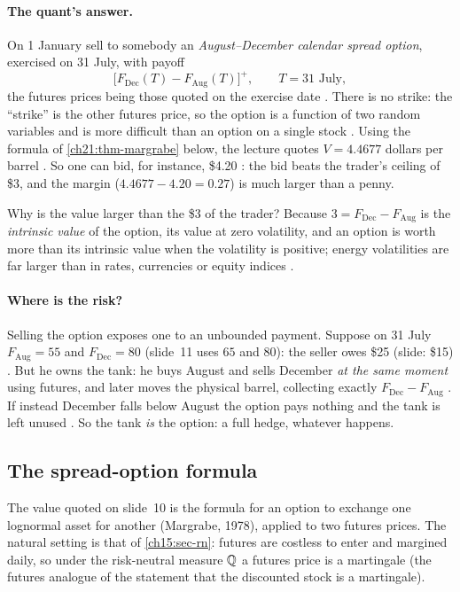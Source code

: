 \begin{paracol}{2}
\paragraph{The quant's answer.} On 1 January sell to somebody an \emph{August--December calendar spread option}, exercised on 31 July, with payoff
\begin{equation}\label{ch21:eq-payoff}
  \bigl[F_{\mathrm{Dec}}(T)-F_{\mathrm{Aug}}(T)\bigr]^+,\qquad T=\text{31 July},
\end{equation}
the futures prices being those quoted on the exercise date . There is no strike: the ``strike'' is the other futures price, so the option is a function of two random
variables and is more difficult than an option on a single stock . Using the formula of \cref{ch21:thm-margrabe} below, the lecture quotes $V=4.4677$ dollars per barrel
. So one can bid, for instance, \$4.20 : the bid beats the trader's ceiling of \$3, and the margin ($4.4677-4.20=0.27$) is much larger than a penny.

Why is the value larger than the \$3 of the trader? Because $3=F_{\mathrm{Dec}}-F_{\mathrm{Aug}}$ is the \emph{intrinsic value} of the option, its value at zero volatility, and an option is worth more than its
intrinsic value when the volatility is positive; energy volatilities are far larger than in rates, currencies or equity indices .

\paragraph{Where is the risk?} Selling the option exposes one to an unbounded payment. Suppose on 31 July $F_{\mathrm{Aug}}=55$ and $F_{\mathrm{Dec}}=80$ (slide~11 uses $65$ and $80$): the seller owes \$25 (slide: \$15)
. But he owns the tank: he buys August and sells December \emph{at the same moment} using futures, and later moves the physical barrel, collecting exactly $F_{\mathrm{Dec}}-F_{\mathrm{Aug}}$
. If instead December falls below August the option pays nothing and the tank is left unused . So the tank \emph{is} the option: a full hedge, whatever happens.

\subsection{The spread-option formula}
The value quoted on slide~10 is the formula for an option to exchange one lognormal asset for another (Margrabe, 1978), applied to two futures prices. The natural setting is that of \cref{ch15:sec-rn}:
futures are costless to enter and margined daily, so under the risk-neutral measure $\mathbb{Q}$ a futures price is a martingale (the futures analogue of the statement that the discounted stock is a martingale).


\end{paracol}
